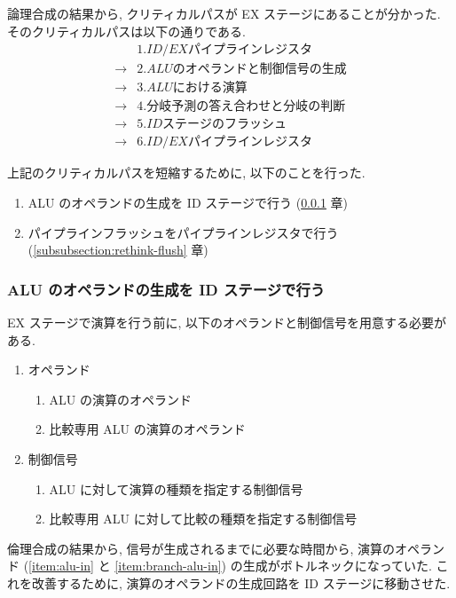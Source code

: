 \documentclass[../improvements.tex]{subfiles}
\begin{document}
  論理合成の結果から, クリティカルパスが EX ステージにあることが分かった.
  そのクリティカルパスは以下の通りである.
  \begin{displaymath}
    \begin{aligned}
      &1. ID/EX パイプラインレジスタ \\
      \rightarrow &2. ALU のオペランドと制御信号の生成 \\
      \rightarrow &3. ALU における演算 \\
      \rightarrow &4. 分岐予測の答え合わせと分岐の判断 \\
      \rightarrow &5. ID ステージのフラッシュ \\
      \rightarrow &6. ID/EX パイプラインレジスタ
    \end{aligned}
  \end{displaymath}

  上記のクリティカルパスを短縮するために, 以下のことを行った.
  \begin{enumerate}
    \item ALU のオペランドの生成を ID ステージで行う (\ref{subsubsection:ex-to-id} 章)
    \item パイプラインフラッシュをパイプラインレジスタで行う (\ref{subsubsection:rethink-flush} 章)
  \end{enumerate}

  \subsubsection{ALU のオペランドの生成を ID ステージで行う} \label{subsubsection:ex-to-id}
  EX ステージで演算を行う前に, 以下のオペランドと制御信号を用意する必要がある.
  \begin{enumerate}
    \item オペランド
      \begin{enumerate}
        \item ALU の演算のオペランド \label{item:alu-in}
        \item 比較専用 ALU の演算のオペランド \label{item:branch-alu-in}
      \end{enumerate}
    \item 制御信号
      \begin{enumerate}
        \item ALU に対して演算の種類を指定する制御信号 \label{item:alu-op}
        \item 比較専用 ALU に対して比較の種類を指定する制御信号 \label{item:branch-alu-op}
      \end{enumerate}
  \end{enumerate}
  倫理合成の結果から, 信号が生成されるまでに必要な時間から, 
  演算のオペランド (\ref{item:alu-in} と \ref{item:branch-alu-in}) の生成がボトルネックになっていた.
  これを改善するために, 演算のオペランドの生成回路を ID ステージに移動させた.
\end{document}
